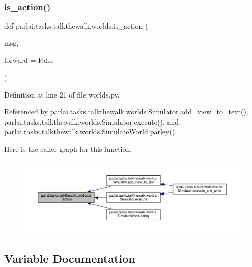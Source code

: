 \subsubsection{\texorpdfstring{is\+\_\+action()}{is\_action()}}
{\footnotesize\ttfamily def parlai.\+tasks.\+talkthewalk.\+worlds.\+is\+\_\+action (\begin{DoxyParamCaption}\item[{}]{msg,  }\item[{}]{forward = {\ttfamily False} }\end{DoxyParamCaption})}



Definition at line 21 of file worlds.\+py.



Referenced by parlai.\+tasks.\+talkthewalk.\+worlds.\+Simulator.\+add\+\_\+view\+\_\+to\+\_\+text(), parlai.\+tasks.\+talkthewalk.\+worlds.\+Simulator.\+execute(), and parlai.\+tasks.\+talkthewalk.\+worlds.\+Simulate\+World.\+parley().

Here is the caller graph for this function\+:
\nopagebreak
\begin{figure}[H]
\begin{center}
\leavevmode
\includegraphics[width=350pt]{namespaceparlai_1_1tasks_1_1talkthewalk_1_1worlds_aa28536df060005c301225d766f91cb13_icgraph}
\end{center}
\end{figure}


\subsection{Variable Documentation}
\mbox{\label{namespaceparlai_1_1tasks_1_1talkthewalk_1_1worlds_a9fdf0043ff89ba3cc64a6afd08305efe}} 
